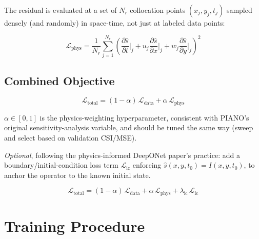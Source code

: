 \documentclass[11pt]{article}
\begin{document}
The residual is evaluated at a set of $N_r$ collocation points $(x_j, y_j, t_j)$ sampled densely (and randomly) in space-time, not just at labeled data points:

\begin{equation}
\mathcal{L}_{\text{phys}} = \frac{1}{N_r} \sum_{j=1}^{N_r} \left( \frac{\partial \hat{s}}{\partial t}\Big|_j + u_j \frac{\partial \hat{s}}{\partial x}\Big|_j + w_j \frac{\partial \hat{s}}{\partial y}\Big|_j \right)^2
\end{equation}

\subsection{Combined Objective}

\begin{equation}
\mathcal{L}_{\text{total}} = (1-\alpha)\, \mathcal{L}_{\text{data}} + \alpha\, \mathcal{L}_{\text{phys}}
\end{equation}

$\alpha \in [0,1]$ is the physics-weighting hyperparameter, consistent with PIANO's original sensitivity-analysis variable, and should be tuned the same way (sweep and select based on validation CSI/MSE).

\emph{Optional}, following the physics-informed DeepONet paper's practice: add a boundary/initial-condition loss term $\mathcal{L}_{\text{ic}}$ enforcing $\hat{s}(x,y,t_0) = I(x,y,t_0)$, to anchor the operator to the known initial state.

\begin{equation}
\mathcal{L}_{\text{total}} = (1-\alpha)\,\mathcal{L}_{\text{data}} + \alpha\,\mathcal{L}_{\text{phys}} + \lambda_{\text{ic}}\,\mathcal{L}_{\text{ic}}
\end{equation}

\section{Training Procedure}
\end{document}
